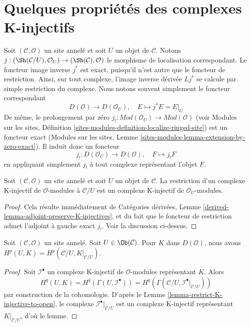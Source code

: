 \section{Quelques propriétés des complexes K-injectifs}
\label{section-properties-K-injective}

\noindent
Soit $(\mathcal{C}, \mathcal{O})$ un site annelé et soit $U$ un objet de
$\mathcal{C}$. Notons
$j : (\Sh(\mathcal{C}/U), \mathcal{O}_U) \to (\Sh(\mathcal{C}), \mathcal{O})$
le morphisme de localisation correspondant. Le foncteur image inverse
$j^*$ est exact, puisqu'il n'est autre que le foncteur de restriction.
Ainsi, sur tout complexe, l'image inverse dérivée $Lj^*$ se calcule par
simple restriction du complexe. Nous notons souvent simplement le foncteur
correspondant
$$
D(\mathcal{O}) \to D(\mathcal{O}_U),
\quad
E \mapsto j^*E = E|_U
$$
De même, le prolongement par zéro
$j_! : \textit{Mod}(\mathcal{O}_U) \to \textit{Mod}(\mathcal{O})$ (voir
Modules sur les sites, Définition
\ref{sites-modules-definition-localize-ringed-site}) est un foncteur exact
(Modules sur les sites, Lemme
\ref{sites-modules-lemma-extension-by-zero-exact}). Il induit donc un
foncteur
$$
j_! : D(\mathcal{O}_U) \to D(\mathcal{O}), \quad
F \mapsto j_!F
$$
en appliquant simplement $j_!$ à tout complexe représentant l'objet $F$.

\begin{lemma}
\label{lemma-restrict-K-injective-to-open}
Soit $(\mathcal{C}, \mathcal{O})$ un site annelé et soit $U$ un objet de
$\mathcal{C}$. La restriction d'un complexe K-injectif de
$\mathcal{O}$-modules à $\mathcal{C}/U$ est un complexe K-injectif de
$\mathcal{O}_U$-modules.
\end{lemma}

\begin{proof}
Cela résulte immédiatement de Catégories dérivées, Lemme
\ref{derived-lemma-adjoint-preserve-K-injectives}, et du fait que le
foncteur de restriction admet l'adjoint à gauche exact $j_!$. Voir la
discussion ci-dessus.
\end{proof}

\begin{lemma}
\label{lemma-unbounded-cohomology-of-open}
Soit $(\mathcal{C}, \mathcal{O})$ un site annelé. Soit
$U \in \Ob(\mathcal{C})$. Pour $K$ dans $D(\mathcal{O})$, nous avons
$H^p(U, K) = H^p(\mathcal{C}/U, K|_{\mathcal{C}/U})$.
\end{lemma}

\begin{proof}
Soit $\mathcal{I}^\bullet$ un complexe K-injectif de $\mathcal{O}$-modules
représentant $K$. Alors
$$
H^q(U, K) = H^q(\Gamma(U, \mathcal{I}^\bullet)) =
H^q(\Gamma(\mathcal{C}/U, \mathcal{I}^\bullet|_{\mathcal{C}/U}))
$$
par construction de la cohomologie. D'après le Lemme
\ref{lemma-restrict-K-injective-to-open}, le complexe
$\mathcal{I}^\bullet|_{\mathcal{C}/U}$ est un complexe K-injectif
représentant $K|_{\mathcal{C}/U}$, d'où le lemme.
\end{proof}

